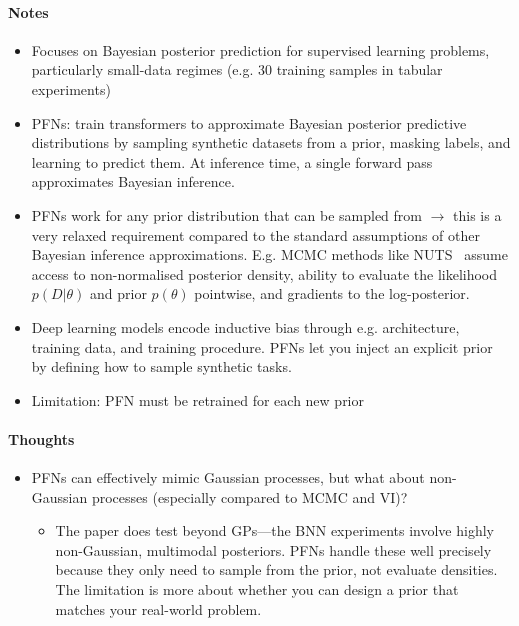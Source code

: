 \documentclass[12pt,a4paper,twoside]{article}
\begin{document}
\begin{paper}
	\paragraph{Notes}
	\begin{itemize}
		\item Focuses on Bayesian posterior prediction for supervised learning problems, particularly small-data regimes (e.g. 30 training samples in tabular experiments)
		\item PFNs: train transformers to approximate Bayesian posterior predictive distributions by sampling synthetic datasets from a prior, masking labels, and learning to predict them. At inference time, a single forward pass approximates Bayesian inference.
		\item PFNs work for any prior distribution that can be sampled from $\rightarrow$ this is a very relaxed requirement compared to the standard assumptions of other Bayesian inference approximations. E.g. MCMC methods like NUTS~\cite{Hoffman2014} assume access to non-normalised posterior density, ability to evaluate the likelihood $p(D|\theta)$ and prior $p(\theta)$ pointwise, and gradients to the log-posterior.
		\item Deep learning models encode inductive bias through e.g. architecture, training data, and training procedure. PFNs let you inject an explicit prior by defining how to sample synthetic tasks.
		\item Limitation: PFN must be retrained for each new prior
	\end{itemize}

	\paragraph{Thoughts}
	\begin{itemize}
		\item PFNs can effectively mimic Gaussian processes, but what about non-Gaussian processes (especially compared to MCMC and VI)?
		      \begin{itemize}
			      \item The paper does test beyond GPs---the BNN experiments involve highly non-Gaussian, multimodal posteriors. PFNs handle these well precisely because they only need to sample from the prior, not evaluate densities. The limitation is more about whether you can design a prior that matches your real-world problem.
		      \end{itemize}
	\end{itemize}
\end{paper}
\end{document}
